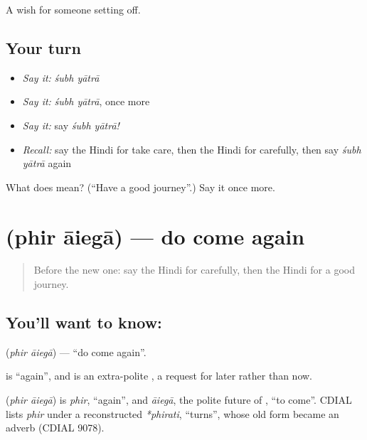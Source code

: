 \begin{grammarlens}[title={What you've built}]
A wish for someone setting off.
\end{grammarlens}

\subsection*{Your turn}
\begin{itemize}
\raggedright
  \item \emph{Say it:} \emph{śubh yātrā}
  \item \emph{Say it:} \emph{śubh yātrā}, once more
  \item \emph{Say it:} say \emph{śubh yātrā!}
  \item \emph{Recall:} say the Hindi for take care, then the Hindi for carefully, then say \emph{śubh yātrā} again
\end{itemize}

\begin{tcolorbox}[breakable,colback=teal!4,colframe=teal!35!black,title={Before you move on}]
What does   mean? (\textquotedblleft{}Have a good journey\textquotedblright{}.) Say it once more.
\end{tcolorbox}
\section[\texorpdfstring{\hi{फिर} \hi{आइएगा} (phir āiegā)}{फिर आइएगा (phir āiegā)}]{  (phir āiegā) — do come again}

\label{lesson:HI-C121-phiraiega}



\begin{quote}
Before the new one: say the Hindi for carefully, then the Hindi for a good journey.
\end{quote}

\subsection*{You'll want to know:  }
\textbf{ } (\emph{phir āiegā}) — \textquotedblleft{}do come again\textquotedblright{}.

\textbf{} is \textquotedblleft{}again\textquotedblright{}, and \textbf{} is an extra-polite \textbf{}, a request for later rather than now.

\begin{cousinweb}
\textbf{ } (\emph{phir āiegā}) is \emph{phir}, \textquotedblleft{}again\textquotedblright{}, and \emph{āiegā}, the polite future of \textbf{}, \textquotedblleft{}to come\textquotedblright{}. CDIAL lists \emph{phir} under a reconstructed \emph{*phirati}, \textquotedblleft{}turns\textquotedblright{}, whose old form became an adverb (CDIAL 9078).
\end{cousinweb}

